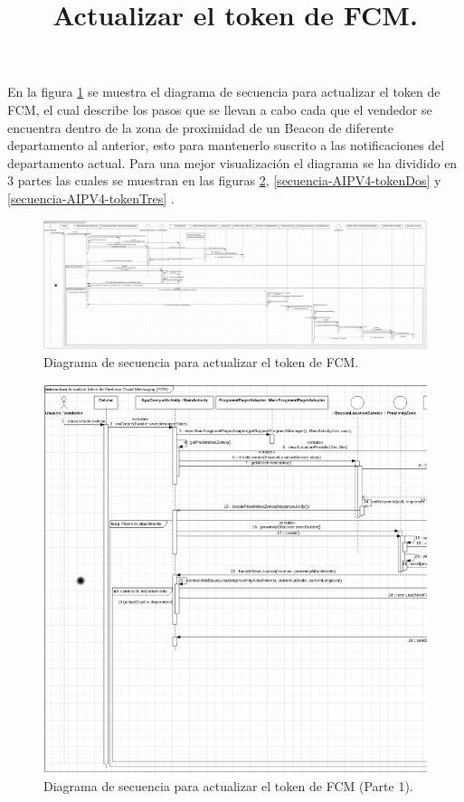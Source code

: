 \title{\textbf{Actualizar el token de FCM.}\\}

En la figura \ref{secuencia-AIPV4-token} se muestra el diagrama de secuencia para actualizar el token de FCM, el cual describe los pasos que se llevan a cabo cada que el vendedor se encuentra dentro de la zona de proximidad de un Beacon de diferente departamento al anterior, esto para mantenerlo suscrito a las notificaciones del departamento actual. Para una mejor visualización el diagrama se ha dividido en 3 partes las cuales se muestran en las figuras \ref{secuencia-AIPV4-tokenUno}, \ref{secuencia-AIPV4-tokenDos}  y \ref{secuencia-AIPV4-tokenTres} .

\FloatBarrier
\begin{figure}[htbp!]
		\centering
			\includegraphics[width=1 \textwidth]{imagenes/adrian/vendedor/prototipoFinal/actualizarFCM}
		\caption{Diagrama de secuencia para actualizar el token de FCM.}
		\label{secuencia-AIPV4-token}
\end{figure}
\FloatBarrier

\FloatBarrier
\begin{figure}[htbp!]
		\centering
			\includegraphics[width=1 \textwidth]{imagenes/adrian/vendedor/prototipoFinal/actualizarFCM1}
		\caption{Diagrama de secuencia para actualizar el token de FCM (Parte 1).}
		\label{secuencia-AIPV4-tokenUno}
\end{figure}
\FloatBarrier

